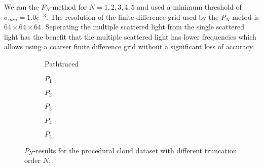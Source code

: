 We ran the $P_N$-method for $N={1,2,3,4,5}$ and used a minimum threshold of $\sigma_{min}=1.0e^{-3}$. The resolution of the finite difference grid used by the $P_N$-metod is $64\times 64\times 64$. Seperating the multiple scattered light from the single scattered light has the benefit that the multiple scattered light has lower frequencies which allows using a coarser finite difference grid without a significant loss of accuracy.
\begin{figure}[h]
\centering
\begin{subfigure}{0.49\columnwidth}
\caption{Pathtraced}
\label{fig:pn_results_nebulae1_pathtraced}
\end{subfigure}%
\hspace{0.01\columnwidth}
\begin{subfigure}{0.49\columnwidth}
\caption{$P_1$}
\label{fig:pn_results_nebulae1_P1}
\end{subfigure}%

\begin{subfigure}{0.49\columnwidth}
\caption{$P_2$}
\label{fig:pn_results_nebulae1_P2}
\end{subfigure}%
\hspace{0.01\columnwidth}
\begin{subfigure}{0.49\columnwidth}
\caption{$P_3$}
\label{fig:pn_results_nebulae1_P3}
\end{subfigure}%


\begin{subfigure}{0.49\columnwidth}
\caption{$P_4$}
\label{fig:pn_results_nebulae1_P4}
\end{subfigure}%
\hspace{0.01\columnwidth}
\begin{subfigure}{0.49\columnwidth}
\caption{$P_5$}
\label{fig:pn_results_nebulae1_P5}
\end{subfigure}%
\caption{$P_N$-results for the procedural cloud dataset with different truncation order $N$.}
\label{fig:pn_results_nebulae1}
\end{figure}

